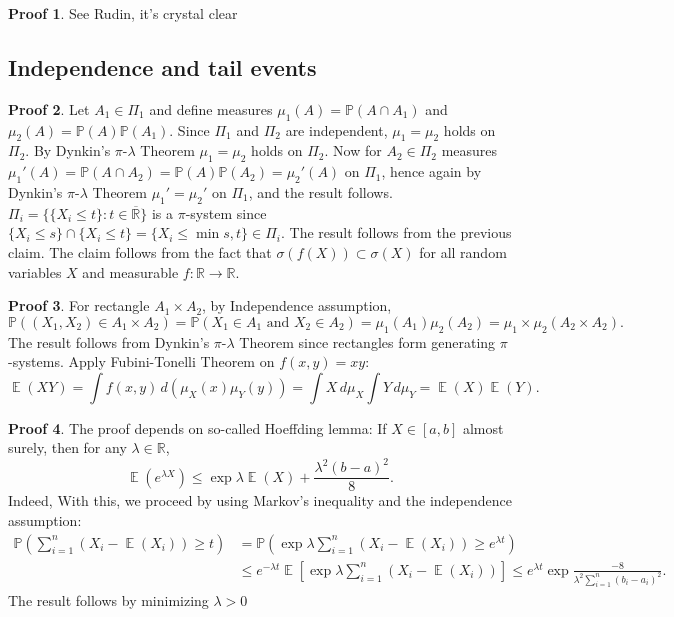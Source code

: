 \documentclass[hidelinks,11pt]{article}
\theoremstyle{definition}
\theoremstyle{dotless}
\newtheorem{prop}{Proof}[section]
\theoremstyle{remark}
\DeclareMathOperator{\E}{\mathbb{E}}
\DeclareMathOperator{\1}{\mathbf{1}}
\begin{document}
\begin{prop}
See Rudin, it's crystal clear
\end{prop}

\subsection{Independence and tail events}

\begin{prop}
Let $A_1\in\Pi_1$ and define measures $\mu_1(A)=\mathbb{P}(A\cap A_1)$ and $\mu_2(A)=\mathbb{P}(A)\mathbb{P}(A_1)$. Since $\Pi_1$ and $\Pi_2$ are independent, $\mu_1=\mu_2$ holds on $\Pi_2$. By Dynkin's $\pi$-$\lambda$ Theorem $\mu_1=\mu_2$ holds on $\Pi_2$. Now for $A_2\in\Pi_2$ measures $\mu_1'(A)=\mathbb{P}(A\cap A_2)=\mathbb{P}(A)\mathbb{P}(A_2)=\mu_2'(A)$ on $\Pi_1$, hence again by Dynkin's $\pi$-$\lambda$ Theorem $\mu_1'=\mu_2'$ on $\Pi_1$, and the result follows.\medbreak
$\Pi_i=\{\{X_i\leq t\}:t\in\overline{\mathbb{R}}\}$ is a $\pi$-system since $\{X_i\leq s\}\cap\{X_i\leq t\}=\{X_i\leq\min{s,t}\}\in\Pi_i$. The result follows from the previous claim.\medbreak
The claim follows from the fact that $\sigma(f(X))\subset\sigma(X)$ for all random variables $X$ and measurable $f:\mathbb{R}\to\mathbb{R}$.
\end{prop}

\begin{prop}
For rectangle $A_1\times A_2$, by Independence assumption,
\[\mathbb{P}((X_1,X_2)\in A_1\times A_2)=\mathbb{P}(X_1\in A_1\textrm{ and }X_2\in A_2)=\mu_1(A_1)\mu_2(A_2)=\mu_1\times\mu_2(A_2\times A_2).\]
The result follows from Dynkin's $\pi$-$\lambda$ Theorem since rectangles form generating $\pi$-systems.\medbreak
Apply Fubini-Tonelli Theorem on $f(x,y)=xy$:
\[\E(XY)=\int f(x,y)\,d(\mu_X(x)\mu_Y(y))=\int X\,d\mu_X\int Y\,d\mu_Y=\E(X)\E(Y).\]
\end{prop}

\begin{prop}
The proof depends on so-called Hoeffding lemma: If $X\in[a,b]$ almost surely, then for any $\lambda\in\mathbb{R}$,
\[\E(e^{\lambda X})\leq\exp{\lambda\E(X)+\frac{\lambda^2(b-a)^2}{8}}.\]
Indeed,\medbreak
With this, we proceed by using Markov's inequality and the independence assumption:
\begin{align*}
    \mathbb{P}\left(\sum_{i=1}^n(X_i-\E(X_i))\geq t\right)&=\mathbb{P}\left(\exp{\lambda\sum_{i=1}^n(X_i-\E(X_i))}\geq e^{\lambda t}\right)\\
    &\leq e^{-\lambda t}\E\left[\exp{\lambda\sum_{i=1}^n(X_i-\E(X_i))}\right]\leq e^{\lambda t}\exp{\frac{-8}{\lambda^2\sum_{i=1}^n(b_i-a_i)^2}}.
\end{align*}
The result follows by minimizing $\lambda>0$
\end{prop}
\end{document}
